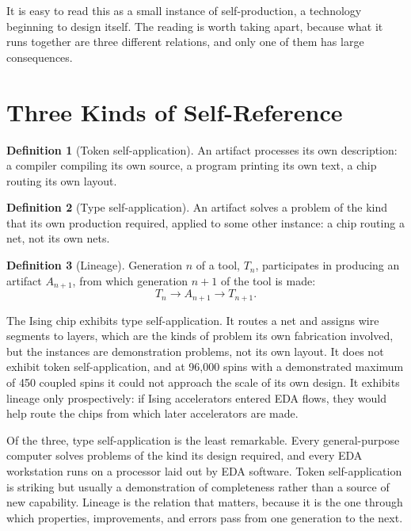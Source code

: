 \documentclass[11pt]{article}
\theoremstyle{definition}
\newtheorem{definition}{Definition}
\theoremstyle{remark}
\begin{document}
It is easy to read this as a small instance of self-production, a technology beginning to design itself. The reading is worth taking apart, because what it runs together are three different relations, and only one of them has large consequences.

\section{Three Kinds of Self-Reference}

\begin{definition}[Token self-application]
An artifact processes its own description: a compiler compiling its own source, a program printing its own text, a chip routing its own layout.
\end{definition}

\begin{definition}[Type self-application]
An artifact solves a problem of the kind that its own production required, applied to some other instance: a chip routing a net, not its own nets.
\end{definition}

\begin{definition}[Lineage]
Generation $n$ of a tool, $T_n$, participates in producing an artifact $A_{n+1}$, from which generation $n+1$ of the tool is made:
\begin{equation}
T_n \longrightarrow A_{n+1} \longrightarrow T_{n+1}.
\end{equation}
\end{definition}

The Ising chip exhibits type self-application. It routes a net and assigns wire segments to layers, which are the kinds of problem its own fabrication involved, but the instances are demonstration problems, not its own layout. It does not exhibit token self-application, and at 96,000 spins with a demonstrated maximum of 450 coupled spins it could not approach the scale of its own design. It exhibits lineage only prospectively: if Ising accelerators entered EDA flows, they would help route the chips from which later accelerators are made.

Of the three, type self-application is the least remarkable. Every general-purpose computer solves problems of the kind its design required, and every EDA workstation runs on a processor laid out by EDA software. Token self-application is striking but usually a demonstration of completeness rather than a source of new capability. Lineage is the relation that matters, because it is the one through which properties, improvements, and errors pass from one generation to the next.
\end{document}
